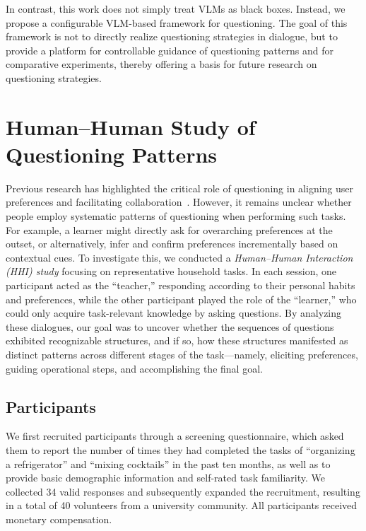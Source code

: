 \documentclass[sigconf,authordraft]{acmart}
\begin{document}
In contrast, this work does not simply treat VLMs as black boxes. Instead, we propose a configurable VLM-based framework for questioning. The goal of this framework is not to directly realize questioning strategies in dialogue, but to provide a platform for controllable guidance of questioning patterns and for comparative experiments, thereby offering a basis for future research on questioning strategies.


\section{Human–Human Study of Questioning Patterns}
Previous research has highlighted the critical role of questioning in aligning user preferences and facilitating collaboration~\cite{cakmak2012designing,hu2024designing}. However, it remains unclear whether people employ systematic patterns of questioning when performing such tasks. For example, a learner might directly ask for overarching preferences at the outset, or alternatively, infer and confirm preferences incrementally based on contextual cues. To investigate this, we conducted a \textit{Human--Human Interaction (HHI) study} focusing on representative household tasks. In each session, one participant acted as the ``teacher,'' responding according to their personal habits and preferences, while the other participant played the role of the ``learner,'' who could only acquire task-relevant knowledge by asking questions. By analyzing these dialogues, our goal was to uncover whether the sequences of questions exhibited recognizable structures, and if so, how these structures manifested as distinct patterns across different stages of the task---namely, eliciting preferences, guiding operational steps, and accomplishing the final goal.

\subsection{Participants}
We first recruited participants through a screening questionnaire, which asked them to report the number of times they had completed the tasks of ``organizing a refrigerator'' and ``mixing cocktails'' in the past ten months, as well as to provide basic demographic information and self-rated task familiarity. We collected 34 valid responses and subsequently expanded the recruitment, resulting in a total of 40 volunteers from a university community. All participants received monetary compensation. 
\end{document}

